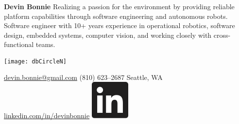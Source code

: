 \documentclass[11pt, twoside, a4paper]{article}
\begin{document}
    \renewcommand{\labelitemi}{\tiny$\bullet$} {
        \hspace{-12px}
        \begin{minipage}[t]{0.33\textwidth}
            \begin{flushleft}
                \noindent
                \textbf{\fontsize{18}{0}\selectfont Devin Bonnie}
                \vspace{7px}
                \linebreak
                \noindent
                Realizing a passion for the environment by providing reliable platform capabilities through software engineering and autonomous robots. Software engineer with 10+ years experience in operational robotics, software design, embedded systems, computer vision, and working closely with cross-functional teams.
                \vspace*{1\baselineskip}
            \end{flushleft}
        \end{minipage}
        \begin{minipage}[c]{0.33\textwidth}
            \begin{center}
                \texttt{[image: dbCircleN]}
            \end{center}
        \end{minipage}
        \begin{minipage}[t]{0.33\textwidth}
            \begin{flushright}
                \vspace*{1.75\baselineskip}
                \href{mailto:devin.bonnie@gmail.com}{devin.bonnie@gmail.com}  \space\space \Letter
                 \vspace{1px}
                \linebreak
                (810) 623--2687 \space\space \Telefon
                 \vspace{1px}
                \linebreak
                Seattle,  WA \space\space \Mundus
                 \vspace{1px}
                \linebreak
                \href{https://www.linkedin.com/in/devinbonnie}{linkedin.com/in/devinbonnie} \space\space \includegraphics[scale=0.40]{linkedin}\hspace{.9px}

\end{flushright}
\end{minipage}}
\end{document}
